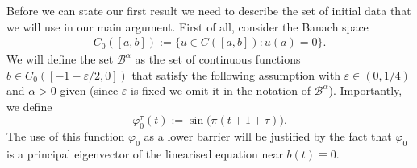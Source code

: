 \documentclass[a4paper,11pt]{article}
\theoremstyle{plain}
\theoremstyle{definition}
\theoremstyle{definition}
\numberwithin{equation}{section}
\begin{document}
Before we can state our first result we need to describe the set of initial data that we will use in our main argument. First of all, consider the Banach space
\begin{align*}\label{def:C-0}
    C_0([a,b]) := \{ u\in C([a,b]) \colon u(a)=0 \}.
\end{align*}
We will define the set $\mathcal{B}^\alpha$ as  the set of continuous functions 
 $b\in C_0([-1-\varepsilon/2,0])$ 
 that satisfy the following assumption with $\varepsilon\in(0,1/4)$ and $\alpha>0$  given (since $\varepsilon$ is fixed we omit it in the notation of $\mathcal{B}^\alpha$). Importantly, we define
 \begin{equation} \label{eq:princ-eigvec}
     \varphi_0^\tau(t):=\sin\big(\pi(t+1+\tau)\big).
 \end{equation}
 The use of this function $\varphi_0$ as a lower barrier will be justified by the fact that $\varphi_0$ is a principal eigenvector of the linearised equation near $b(t)\equiv 0$.
\end{document}

